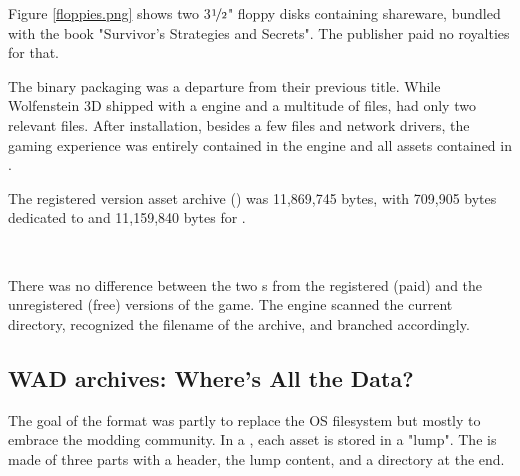 \par
\vspace{-10pt}
Figure \ref{floppies.png} shows two 3$\nicefrac{1}{2}$" floppy disks containing \doom{} shareware, bundled with the book "Survivor's Strategies and Secrets". The publisher paid no royalties for that.\\
\par
The binary packaging was a departure from their previous title. While Wolfenstein 3D shipped with a  engine and a multitude of  files, \doom{} had only two relevant files. After installation, besides a few  files and network drivers, the gaming experience was entirely contained in the engine  and all assets contained in .\\
\vspace{3mm}

\vspace{2mm}
The registered version asset archive () was 11,869,745 bytes, with 709,905 bytes dedicated to  and 11,159,840 bytes for .
\pagebreak

\\
\par
There was no difference between the two s from the registered (paid) and the unregistered (free) versions of the game. The engine scanned the current directory, recognized the filename of the  archive, and branched accordingly.\\
\par
{}
%  




\subsection{WAD archives: Where's All the Data?}
\label{wad_explained}
The goal of the  format was partly to replace the OS filesystem but mostly to embrace the modding community. In a , each asset is stored in a "lump". The  is made of three parts with a header, the lump content, and a directory at the end.\\

